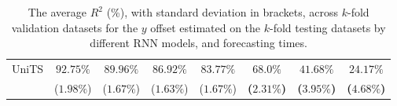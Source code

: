 \begin{table}[!ht]
{\begin{tabular}{|c|c|c|c|c|c|c|c|}
			\multirow{2}{*}{UniTS} & $92.75\%$ & $89.96\%$ & $86.92\%$ & $83.77\%$ & $\mathbf{68.0\%}$ & $\mathbf{41.68\%}$ & $\mathbf{24.17\%}$ \\
			 & ($1.98\%$) & ($1.67\%$) & ($1.63\%$) & ($1.67\%$) & \textbf{(}$\mathbf{2.31\%}$\textbf{)} & \textbf{(}$\mathbf{3.95\%}$\textbf{)} & \textbf{(}$\mathbf{4.68\%}$\textbf{)} \\ \hline
		\end{tabular}
	}
	\caption{The average $R^{2}$ (\%), with standard deviation in brackets, across $k$-fold validation datasets for the $y$ offset estimated on the $k$-fold testing datasets by different RNN models, and forecasting times.}
	\label{tab:all_latitude_no_abs_R2}
\end{table}